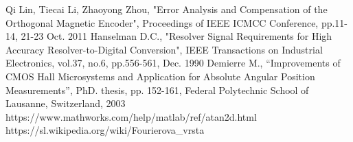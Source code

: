 \documentclass[a4paper]{article}
\begin{document}
\small
\begin{thebibliography}{1}
 Qi Lin, Tiecai Li, Zhaoyong Zhou, "Error Analysis and Compensation
of the Orthogonal Magnetic Encoder", Proceedings of IEEE ICMCC
Conference, pp.11-14, 21-23 Oct. 2011
 Hanselman D.C., "Resolver Signal Requirements for High Accuracy
Resolver-to-Digital Conversion", IEEE Transactions on Industrial
Electronics, vol.37, no.6, pp.556-561, Dec. 1990 
 Demierre M., “Improvements of CMOS Hall Microsystems and
Application for Absolute Angular Position Measurements”, PhD. thesis,
pp. 152-161, Federal Polytechnic School of Lausanne, Switzerland, 2003 
 https://www.mathworks.com/help/matlab/ref/atan2d.html
 https://sl.wikipedia.org/wiki/Fourierova\_vrsta


\end{thebibliography}
\end{document}
